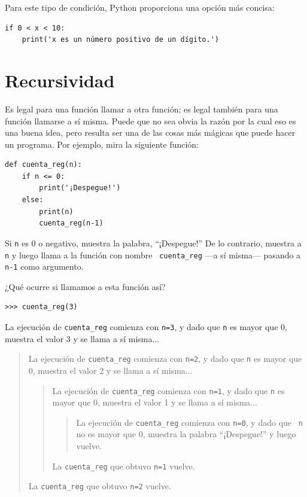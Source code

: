 \documentclass[10pt]{book}
\begin{document}
Para este tipo de condición, Python proporciona una opción más concisa:

\begin{verbatim}
if 0 < x < 10:
    print('x es un número positivo de un dígito.')
\end{verbatim}


\section{Recursividad}
\label{recursion}

Es legal para una función llamar a otra función;
es legal también para una función llamarse a sí misma.  Puede que no sea obvia
la razón por la cual eso es una buena idea, pero resulta ser una de las cosas más
mágicas que puede hacer un programa.
Por ejemplo, mira la siguiente función:

\begin{verbatim}
def cuenta_reg(n):
    if n <= 0:
        print('¡Despegue!')
    else:
        print(n)
        cuenta_reg(n-1)
\end{verbatim}
%
Si {\tt n} es 0 o negativo, muestra la palabra, ``¡Despegue!''
De lo contrario, muestra a {\tt n} y luego llama a la función con nombre {\tt
cuenta\_reg} ---a sí misma--- pasando a {\tt n-1} como argumento.

¿Qué ocurre si llamamos a esta función así?

\begin{verbatim}
>>> cuenta_reg(3)
\end{verbatim}
%
La ejecución de {\tt cuenta\_reg} comienza con {\tt n=3}, y dado que
{\tt n} es mayor que 0, muestra el valor 3 y se llama a sí misma...

\begin{quote}
La ejecución de {\tt cuenta\_reg} comienza con {\tt n=2}, y dado que
{\tt n} es mayor que 0, muestra el valor 2 y se llama a sí misma...

\begin{quote}
La ejecución de {\tt cuenta\_reg} comienza con {\tt n=1}, y dado que
{\tt n} es mayor que 0, muestra el valor 1 y se llama a sí misma...

\begin{quote}
La ejecución de {\tt cuenta\_reg} comienza con {\tt n=0}, y dado que {\tt
n} no es mayor que 0, muestra la palabra ``¡Despegue!'' y luego
vuelve.
\end{quote}

La {\tt cuenta\_reg} que obtuvo {\tt n=1} vuelve.
\end{quote}

La {\tt cuenta\_reg} que obtuvo {\tt n=2} vuelve.
\end{quote}
\end{document}
